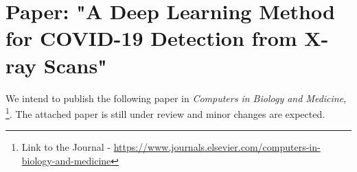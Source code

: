 \documentclass[
11pt, %
oneside,
english,
doublespacing, 
nolistspacing,
liststotoc, %
toctotoc, %
parskip, %
headsepline, %
consistentlayout, %
]{COVID-19 Detection - agl2} %
\begin{document}
\pagestyle{thesis} %



 


 
 

\printbibliography[heading=bibintoc]


\appendix %








% 

\chapter{Paper: "A Deep Learning Method for COVID-19 Detection from X-ray Scans"} \label{appendix:paper}
We intend to publish the following paper in \textit{Computers in Biology and Medicine}, \footnote{Link to the Journal - \url{https://www.journals.elsevier.com/computers-in-biology-and-medicine}}. The attached paper is still under review and minor changes are expected.


%
\end{document}
